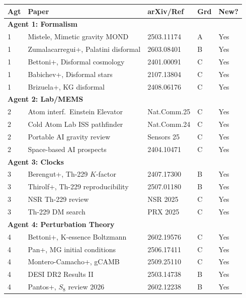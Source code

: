 \documentclass[11pt]{article}
\begin{document}
\begin{longtable}{p{}p{}p{}p{}p{}}
\toprule
\textbf{Agt} & \textbf{Paper} & \textbf{arXiv/Ref} & \textbf{Grd} & \textbf{New?} \\
\midrule
\endhead

\multicolumn{5}{l}{\textbf{Agent 1: Formalism}} \\
\midrule
1 & Mistele, Mimetic gravity MOND & 2503.11174 & A & Yes \\
1 & Zumalacarregui+, Palatini disformal & 2603.08401 & B & Yes \\
1 & Bettoni+, Disformal cosmology & 2401.00091 & C & Yes \\
1 & Babichev+, Disformal stars & 2107.13804 & C & Yes \\
1 & Brizuela+, KG disformal & 2408.06176 & C & Yes \\
\midrule

\multicolumn{5}{l}{\textbf{Agent 2: Lab/MEMS}} \\
\midrule
2 & Atom interf.\ Einstein Elevator & Nat.Comm.25 & C & Yes \\
2 & Cold Atom Lab ISS pathfinder & Nat.Comm.24 & C & Yes \\
2 & Portable AI gravity review & Sensors 25 & C & Yes \\
2 & Space-based AI prospects & 2404.10471 & C & Yes \\
\midrule

\multicolumn{5}{l}{\textbf{Agent 3: Clocks}} \\
\midrule
3 & Berengut+, Th-229 $K$-factor & 2407.17300 & B & Yes \\
3 & Thirolf+, Th-229 reproducibility & 2507.01180 & B & Yes \\
3 & NSR Th-229 review & NSR 2025 & C & Yes \\
3 & Th-229 DM search & PRX 2025 & C & Yes \\
\midrule

\multicolumn{5}{l}{\textbf{Agent 4: Perturbation Theory}} \\
\midrule
4 & Bettoni+, K-essence Boltzmann & 2602.19576 & C & Yes \\
4 & Pan+, MG initial conditions & 2506.17411 & C & Yes \\
4 & Montero-Camacho+, gCAMB & 2509.25110 & C & Yes \\
4 & DESI DR2 Results II & 2503.14738 & B & Yes \\
4 & Pantos+, $S_8$ review 2026 & 2602.12238 & B & Yes \\
\midrule


\end{longtable}
\end{document}
